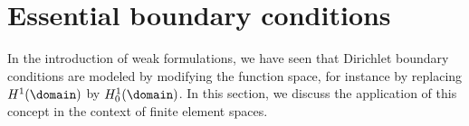 \section{Essential boundary conditions}

\begin{intro}
  In the introduction of weak formulations, we have seen that
  Dirichlet boundary conditions are modeled by modifying the function
  space, for instance by replacing $H^1(\domain)$ by
  $H^1_0(\domain)$. In this section, we discuss the application of
  this concept in the context of finite element spaces.
\end{intro}


